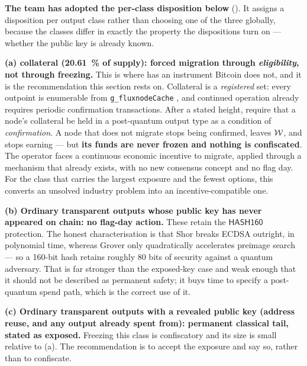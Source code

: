 \begin{remark}
\label{rem:pq-disposition}
\textbf{The team has adopted the per-class disposition below}  (\planned). It assigns a disposition per output class rather than choosing one of the three
globally, because the classes differ in exactly the property the dispositions turn on --- whether the
public key is already known.

\textbf{(a) \FluxNode{} collateral (\SI{20.61}{\percent} of supply): forced migration through
\emph{eligibility}, not through freezing.} This is where \Flux{} has an instrument Bitcoin does not,
and it is the recommendation this section rests on. Collateral is a \emph{registered} set: every
outpoint is enumerable from \texttt{g\_fluxnode\allowbreak{}Cache}
, and continued operation already requires
periodic confirmation transactions. After a stated height, require that a node's collateral be held in
a post-quantum output type as a condition of \emph{confirmation}. A node that does not migrate stops
being confirmed, leaves $\mathcal{W}$, and stops earning --- but \textbf{its funds are never frozen and
nothing is confiscated}. The operator faces a continuous economic incentive to migrate, applied
through a mechanism that already exists, with no new consensus concept and no flag day. For the class
that carries the largest exposure and the fewest options, this converts an unsolved industry problem
into an incentive-compatible one.

\textbf{(b) Ordinary transparent outputs whose public key has never appeared on chain: no flag-day
action.} These retain the $\mathsf{HASH160}$ protection. The honest characterisation is that Shor
breaks ECDSA outright, in polynomial time, whereas Grover only quadratically accelerates preimage
search --- so a \num{160}-bit hash retains roughly \num{80} bits of security against a quantum
adversary. That is far stronger than the exposed-key case and weak enough that it should not be
described as permanent safety; it buys time to specify a post-quantum spend path, which is the
correct use of it.

\textbf{(c) Ordinary transparent outputs with a revealed public key (address reuse, and any output
already spent from): permanent classical tail, stated as exposed.} Freezing this class is
confiscatory and its size is small relative to (a). The recommendation is to accept the exposure and
say so, rather than to confiscate. 


\end{remark}
